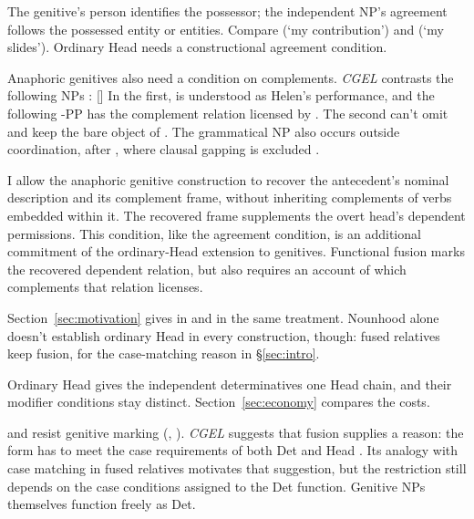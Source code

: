 \documentclass[12pt]{article}
\begin{document}
The genitive's person identifies the possessor; the independent NP's agreement follows the possessed entity or entities. Compare  (\enquote*{my contribution}) and  (\enquote*{my slides}). Ordinary Head needs a constructional agreement condition.

Anaphoric genitives also need a condition on complements. \textit{CGEL} contrasts the following NPs \citep[420--421, (36ii), (37iib)]{huddleston2002}:
\ea\label{ex:genitive-complements}
\ea {} []
\ex {}
\z
\z
In the first,  is understood as Helen's performance, and the following -PP has the complement relation licensed by . The second can't omit  and keep the bare object of . The grammatical NP also occurs outside coordination, after , where clausal gapping is excluded \citep[420--421, (37i)]{huddleston2002}.

I allow the anaphoric genitive construction to recover the antecedent's nominal description and its complement frame, without inheriting complements of verbs embedded within it. The recovered frame supplements the overt head's dependent permissions. This condition, like the agreement condition, is an additional commitment of the ordinary-Head extension to genitives. Functional fusion marks the recovered dependent relation, but also requires an account of which complements that relation licenses.

Section~\ref{sec:motivation} gives  in  and  in  the same treatment. Nounhood alone doesn't establish ordinary Head in every construction, though: fused relatives keep fusion, for the case-matching reason in §\ref{sec:intro}.

Ordinary Head gives the independent determinatives one Head chain, and their modifier conditions stay distinct. Section~\ref{sec:economy} compares the costs.

 and  resist genitive marking (, ). \textit{CGEL} suggests that fusion supplies a reason: the form has to meet the case requirements of both Det and Head \citep[420]{huddleston2002}. Its analogy with case matching in fused relatives \citep[1073--1074]{huddleston2002} motivates that suggestion, but the restriction still depends on the case conditions assigned to the Det function. Genitive NPs themselves function freely as Det.
\end{document}
